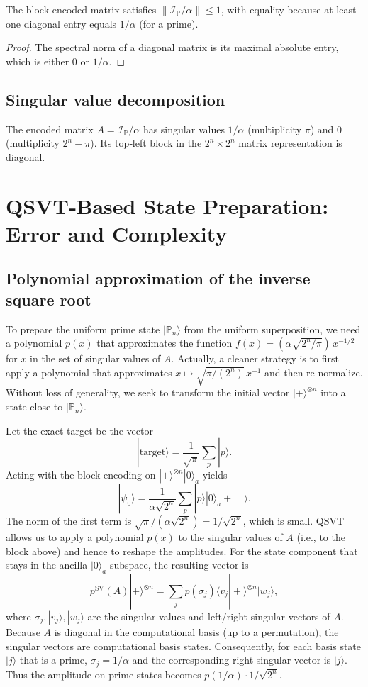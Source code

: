 \documentclass[12pt,a4paper]{article}
\begin{document}
\begin{lemma}\label{lem:norm-enc}
The block‑encoded matrix satisfies \(\|\mathcal{I}_{\mathbb{P}}/\alpha\|\le 1\), with equality because at least one diagonal entry equals \(1/\alpha\) (for a prime).
\end{lemma}
\begin{proof}
The spectral norm of a diagonal matrix is its maximal absolute entry, which is either \(0\) or \(1/\alpha\).
\end{proof}

\subsection{Singular value decomposition}
The encoded matrix \(A = \mathcal{I}_{\mathbb{P}}/\alpha\) has singular values \(1/\alpha\) (multiplicity \(\pi\)) and \(0\) (multiplicity \(2^n-\pi\)).  Its top‑left block in the \(2^n\times 2^n\) matrix representation is diagonal.

\section{QSVT‑Based State Preparation: Error and Complexity}

\subsection{Polynomial approximation of the inverse square root}
To prepare the uniform prime state \(|\mathbb{P}_n\rangle\) from the uniform superposition, we need a polynomial \(p(x)\) that approximates the function \(f(x) = (\alpha \sqrt{2^n/\pi})\, x^{-1/2}\) for \(x\) in the set of singular values of \(A\).  Actually, a cleaner strategy is to first apply a polynomial that approximates \(x \mapsto \sqrt{\pi/(2^n)}\, x^{-1}\) and then re‑normalize.  Without loss of generality, we seek to transform the initial vector \(|+\rangle^{\otimes n}\) into a state close to \(|\mathbb{P}_n\rangle\).

Let the exact target be the vector
\[
|\text{target}\rangle = \frac{1}{\sqrt{\pi}} \sum_{p} |p\rangle .
\]
Acting with the block encoding on \(|+\rangle^{\otimes n}|0\rangle_a\) yields
\[
|\psi_0\rangle = \frac{1}{\alpha\sqrt{2^n}} \sum_{p} |p\rangle|0\rangle_a + |\bot\rangle .
\]
The norm of the first term is \(\sqrt{\pi}/(\alpha\sqrt{2^n}) = 1/\sqrt{2^n}\), which is small.  QSVT allows us to apply a polynomial \(p(x)\) to the singular values of \(A\) (i.e., to the block above) and hence to reshape the amplitudes.  For the state component that stays in the ancilla \(|0\rangle_a\) subspace, the resulting vector is
\[
p^{\text{SV}}(A)|+\rangle^{\otimes n} = \sum_{j} p(\sigma_j) \langle v_j|+\rangle^{\otimes n} |w_j\rangle,
\]
where \(\sigma_j, |v_j\rangle, |w_j\rangle\) are the singular values and left/right singular vectors of \(A\).  Because \(A\) is diagonal in the computational basis (up to a permutation), the singular vectors are computational basis states.  Consequently, for each basis state \(|j\rangle\) that is a prime, \(\sigma_j = 1/\alpha\) and the corresponding right singular vector is \(|j\rangle\).  Thus the amplitude on prime states becomes \(p(1/\alpha) \cdot 1/\sqrt{2^n}\).
\end{document}
